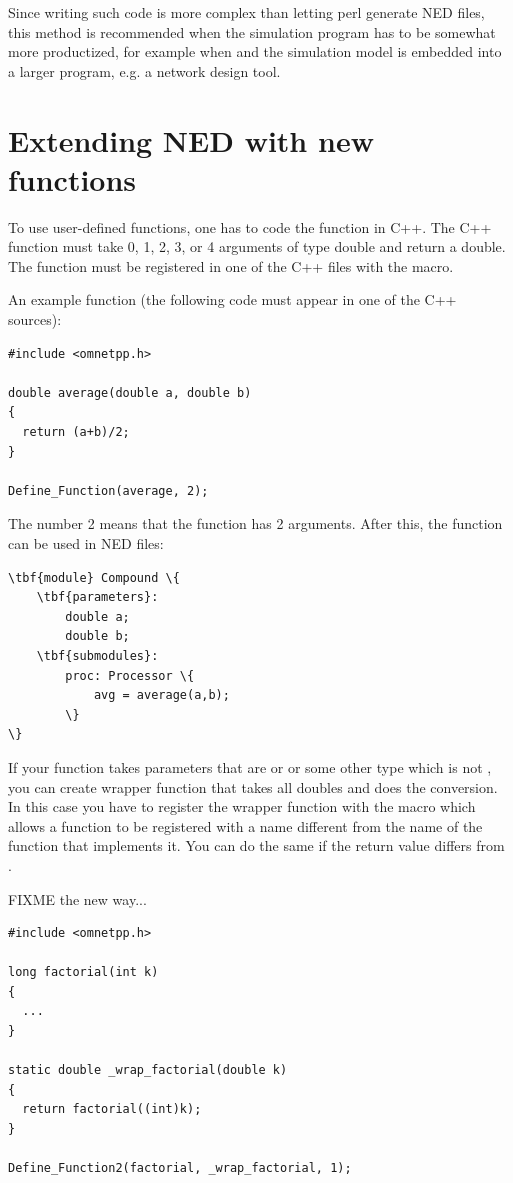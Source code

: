 Since writing such code is more complex than letting perl generate
NED files, this method is recommended when the simulation program
has to be somewhat more productized, for example when {\opp}
and the simulation model is embedded into a larger program, e.g.
a network design tool.


\section{Extending NED with new functions}
\label{sec:ch-ned-lang:defining-functions}

To use user-defined functions, one has
to code the function in C++.  The C++ function must take 0, 1, 2, 3, or 4
arguments of type double and return a double. The function must be
registered in one of the C++ files with the 
macro.

An example function (the following code must appear in one of the C++
sources):


\begin{verbatim}
#include <omnetpp.h>

double average(double a, double b)
{
  return (a+b)/2;
}

Define_Function(average, 2);
\end{verbatim}

The number 2 means that the  function has 2
arguments. After this, the  function can be used in
NED files:

\begin{Verbatim}[commandchars=\\\{\}]
\tbf{module} Compound \{
    \tbf{parameters}:
        double a;
        double b;
    \tbf{submodules}:
        proc: Processor \{
            avg = average(a,b);
        \}
\}
\end{Verbatim}


If your function takes parameters that are  or  or
some other type which is not , you can create wrapper function
that takes all doubles and does the conversion. In this case you have
to register the wrapper function with the  macro
which allows a function to be registered with a name different from the
name of the function that implements it. You can do the same
if the return value differs from .

FIXME the new way...

\begin{verbatim}
#include <omnetpp.h>

long factorial(int k)
{
  ...
}

static double _wrap_factorial(double k)
{
  return factorial((int)k);
}

Define_Function2(factorial, _wrap_factorial, 1);
\end{verbatim}




